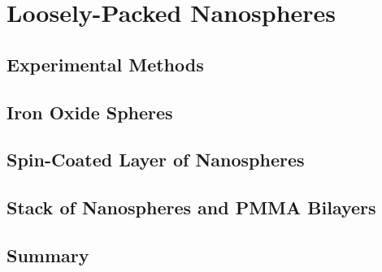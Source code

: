 \documentclass[\main/dresen_thesis.tex]{subfiles}
\renewcommand{\thisPath}{\main/chapters/looselyPackedNS}
\begin{document}
  \chapter{Loosely-Packed Nanospheres}\label{ch:looselyPackedNS}
    
      \FloatBarrier
      \clearpage

    \section{Experimental Methods}
      
        \FloatBarrier
        \clearpage

    \section{Iron Oxide Spheres}\label{sec:looselyPackedNP:sphericalIronOxideNP}
      
        \FloatBarrier
        \clearpage

    \section{Spin-Coated Layer of Nanospheres}
      
      \FloatBarrier
        \clearpage

    \section{Stack of Nanospheres and PMMA Bilayers}
      
      \FloatBarrier
        \clearpage

    \section{Summary}
      
      \FloatBarrier
\end{document}
